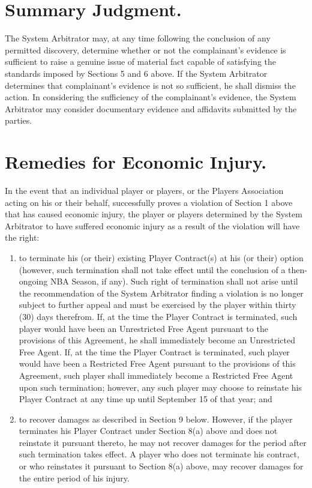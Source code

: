 \documentclass[
]{book}
\providecommand{\tightlist}{%
  \setlength{\itemsep}{0pt}\setlength{\parskip}{0pt}}
\begin{document}
\hypertarget{summary-judgment.}{%
\section{Summary Judgment.}\label{summary-judgment.}}

The System Arbitrator may, at any time following the conclusion of any permitted discovery, determine whether or not the complainant's evidence is sufficient to raise a genuine issue of material fact capable of satisfying the standards imposed by Sections 5 and 6 above. If the System Arbitrator determines that complainant's evidence is not so sufficient, he shall dismiss the action. In considering the sufficiency of the complainant's evidence, the System Arbitrator may consider documentary evidence and affidavits submitted by the parties.

\hypertarget{remedies-for-economic-injury.}{%
\section{Remedies for Economic Injury.}\label{remedies-for-economic-injury.}}

In the event that an individual player or players, or the Players Association acting on his or their behalf, successfully proves a violation of Section 1 above that has caused economic injury, the player or players determined by the System Arbitrator to have suffered economic injury as a result of the violation will have the right:

\begin{enumerate}
\def\labelenumi{(\alph{enumi})}
\tightlist
\item
  to terminate his (or their) existing Player Contract(s) at his (or their) option (however, such termination shall not take effect until the conclusion of a then-ongoing NBA Season, if any). Such right of termination shall not arise until the recommendation of the System Arbitrator finding a violation is no longer subject to further appeal and must be exercised by the player within thirty (30) days therefrom. If, at the time the Player Contract is terminated, such player would have been an Unrestricted Free Agent pursuant to the provisions of this Agreement, he shall immediately become an Unrestricted Free Agent. If, at the time the Player Contract is terminated, such player would have been a Restricted Free Agent pursuant to the provisions of this Agreement, such player shall immediately become a Restricted Free Agent upon such termination; however, any such player may choose to reinstate his Player Contract at any time up until September 15 of that year; and
\item
  to recover damages as described in Section 9 below. However, if the player terminates his Player Contract under Section 8(a) above and does not reinstate it pursuant thereto, he may not recover damages for the period after such termination takes effect. A player who does not terminate his contract, or who reinstates it pursuant to Section 8(a) above, may recover damages for the entire period of his injury.
\end{enumerate}
\end{document}
